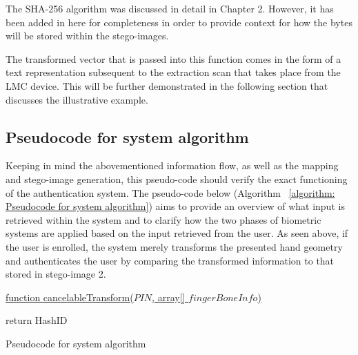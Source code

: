
The SHA-256 algorithm was discussed in detail in Chapter 2. However, it has been added in here for completeness in order to provide context for how the bytes will be stored within the stego-images. 

The transformed vector that is passed into this function comes in the form of a text representation subsequent to the extraction scan that takes place from the LMC device. This will be further demonstrated in the following section that discusses the illustrative example.


\subsection{Pseudocode for system algorithm}

Keeping in mind the abovementioned information flow, as well as the mapping and stego-image generation, this pseudo-code should verify the exact functioning of the authentication system.
The pseudo-code below (Algorithm ~\ref{algorithm: Pseudocode for system algorithm}) aims to provide an overview of what input is retrieved within the system and to clarify how the two phases of biometric systems are applied based on the input retrieved from the user. As seen above, if the user is enrolled, the system merely transforms the presented hand geometry and authenticates the user by comparing the transformed information to that stored in stego-image 2.


\begin{algorithm}
     
     \underline{function cancelableTransform($PIN$, array[] $fingerBoneInfo$)}\;
     
        
      return HashID\;
     
     \label{algorithm: Pseudocode for system algorithm}
     \caption{Pseudocode for system algorithm}
\end{algorithm}

